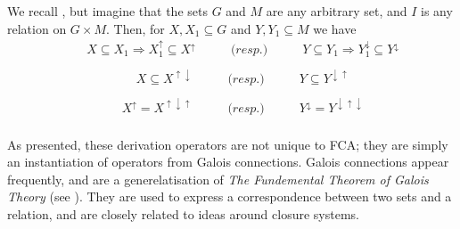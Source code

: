 \begin{proposition}
\label{proposition:properties-derivation-operators}
	We recall , but imagine that the sets $G$ and $M$ are any arbitrary set, and $I$ is any relation on $G \times M$. Then, for $X, X_1 \subseteq G$ and $Y, Y_1 \subseteq M$ we have
	\begin{equation}
    \begin{aligned}
    \label{equation:galois-1}
    & \quad X \subseteq X_1 \Rightarrow X_1^\uparrow \subseteq X^\uparrow \qquad & \textit{(resp.)} & \qquad Y \subseteq Y_1 \Rightarrow Y_1^\downarrow \subseteq Y^\downarrow \\
    \end{aligned}
    \end{equation}
    \begin{equation}
    \begin{aligned}
    & \quad X \subseteq X^{\uparrow \downarrow} \qquad & \textit{(resp.)} & \qquad Y \subseteq Y^{\downarrow \uparrow} \\
    \end{aligned}
    \end{equation}
    \begin{equation}
    \label{equation:galois-3}
    \begin{aligned}
    & \quad X^\uparrow = X^{\uparrow \downarrow \uparrow} \qquad & \textit{(resp.)} & \qquad Y^\downarrow = Y^{\downarrow \uparrow \downarrow} \\
     \end{aligned}
    \end{equation}
\end{proposition}


As presented, these derivation operators are not unique to FCA; they are simply an instantiation of operators from Galois connections. Galois connections appear frequently, and are a generelatisation of \textit{The Fundemental Theorem of Galois Theory} (see \cite[pp. 205]{bergman2015invitation}). They are used to express a correspondence between two sets and a relation, and are closely related to ideas around closure systems.











